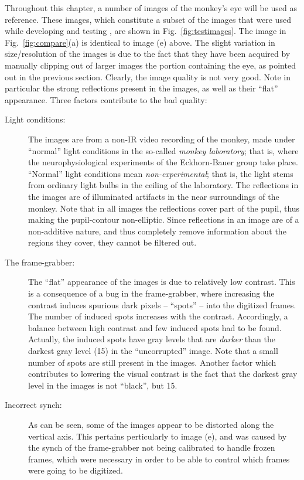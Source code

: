 \noindent Throughout this chapter, a number of images of the monkey's
eye will be used as reference.  These images, which constitute a
subset of the images that were used while developing and testing
{\octopus}, are shown in Fig.~\ref{fig:testimages}.  The image in
Fig.~\ref{fig:compare}(a) is identical to image (e) above.  The slight
variation in size/resolution of the images is due to the fact that
they have been acquired by manually clipping out of larger images the
portion containing the eye, as pointed out in the previous section.
Clearly, the image quality is not very good.  Note in particular the
strong reflections present in the images, as well as their ``flat''
appearance.  Three factors contribute to the bad quality:
\begin{description}
\item[Light conditions:] The images are from a non-IR video recording
  of the monkey, made under ``normal'' light conditions in the
  so-called {\em monkey laboratory\/}; that is, where the
  neurophysiological experiments of the Eckhorn-Bauer group take
  place.  ``Normal'' light conditions mean {\em non-experimental\/};
  that is, the light stems from ordinary light bulbs in the ceiling of the laboratory.
  The reflections in the images are of illuminated artifacts in the
  near surroundings of the monkey.  Note that in all images the
  reflections cover part of the pupil, thus making the pupil-contour
  non-elliptic.  Since reflections in an image are of a non-additive
  nature, and thus completely remove information about the regions
  they cover, they cannot be filtered out.
\item[The frame-grabber:] The ``flat'' appearance of the images is due
  to relatively low contrast.  This is a consequence of a bug in the
  frame-grabber, where increasing the contrast induces spurious dark
  pixels -- ``spots'' -- into the digitized frames.  The number of
  induced spots increases with the contrast.  Accordingly, a balance
  between high contrast and few induced spots had to be found.
  Actually, the induced spots have gray levels that are {\em darker\/}
  than the darkest gray level (15) in the ``uncorrupted'' image.  Note
  that a small number of spots are still present in the images.
  Another factor which contributes to lowering the visual contrast is
  the fact that the darkest gray level in the images is not ``black'',
  but 15.
\item[Incorrect synch:] As can be seen, some of the images appear to
  be distorted along the vertical axis.  This pertains perticularly to
  image (e), and was caused by the synch of the frame-grabber not
  being calibrated to handle frozen frames, which were necessary in
  order to be able to control which frames were going to be digitized.
\end{description}

